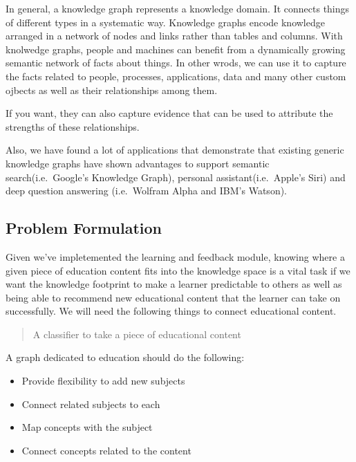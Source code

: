 \documentclass[]{book}
\theoremstyle{definition}
\theoremstyle{definition}
\theoremstyle{definition}
\theoremstyle{remark}
\begin{document}
In general, a knowledge graph represents a knowledge domain. It connects
things of different types in a systematic way. Knowledge graphs encode
knowledge arranged in a network of nodes and links rather than tables
and columns. With knolwedge graphs, people and machines can benefit from
a dynamically growing semantic network of facts about things. In other
wrods, we can use it to capture the facts related to people, processes,
applications, data and many other custom ojbects as well as their
relationships among them.

If you want, they can also capture evidence that can be used to
attribute the strengths of these relationships.

Also, we have found a lot of applications that demonstrate that existing
generic knowledge graphs have shown advantages to support semantic
search(i.e.~Google's Knowledge Graph), personal assistant(i.e.~Apple's
Siri) and deep question answering (i.e.~Wolfram Alpha and IBM's Watson).

\subsection{Problem Formulation}\label{problem-formulation-2}

Given we've impletemented the learning and feedback module, knowing
where a given piece of education content fits into the knowledge space
is a vital task if we want the knowledge footprint to make a learner
predictable to others as well as being able to recommend new educational
content that the learner can take on successfully. We will need the
following things to connect educational content.

\begin{quote}
A classifier to take a piece of educational content
\end{quote}

A graph dedicated to education should do the following:

\begin{itemize}
\item
  Provide flexibility to add new subjects
\item
  Connect related subjects to each
\item
  Map concepts with the subject
\item
  Connect concepts related to the content
\end{itemize}
\end{document}
